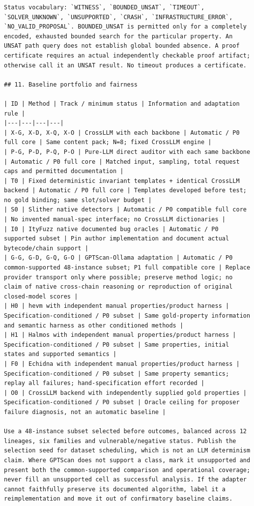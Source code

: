 \documentclass[11pt,a4paper]{article}
\begin{document}
\begin{verbatim}
Status vocabulary: `WITNESS`, `BOUNDED_UNSAT`, `TIMEOUT`, `SOLVER_UNKNOWN`, `UNSUPPORTED`, `CRASH`, `INFRASTRUCTURE_ERROR`, `NO_VALID_PROPOSAL`. BOUNDED_UNSAT is permitted only for a completely encoded, exhausted bounded search for the particular property. An UNSAT path query does not establish global bounded absence. A proof certificate requires an actual independently checkable proof artifact; otherwise call it an UNSAT result. No timeout produces a certificate.

## 11. Baseline portfolio and fairness

| ID | Method | Track / minimum status | Information and adaptation rule |
|---|---|---|---|
| X-G, X-D, X-Q, X-O | CrossLLM with each backbone | Automatic / P0 full core | Same content pack; N=8; fixed CrossLLM engine |
| P-G, P-D, P-Q, P-O | Pure-LLM direct auditor with each same backbone | Automatic / P0 full core | Matched input, sampling, total request caps and permitted documentation |
| T0 | Fixed deterministic invariant templates + identical CrossLLM backend | Automatic / P0 full core | Templates developed before test; no gold binding; same slot/solver budget |
| S0 | Slither native detectors | Automatic / P0 compatible full core | No invented manual-spec interface; no CrossLLM dictionaries |
| I0 | ItyFuzz native documented bug oracles | Automatic / P0 supported subset | Pin author implementation and document actual bytecode/chain support |
| G-G, G-D, G-Q, G-O | GPTScan-Ollama adaptation | Automatic / P0 common-supported 48-instance subset; P1 full compatible core | Replace provider transport only where possible; preserve method logic; no claim of native cross-chain reasoning or reproduction of original closed-model scores |
| H0 | hevm with independent manual properties/product harness | Specification-conditioned / P0 subset | Same gold-property information and semantic harness as other conditioned methods |
| H1 | Halmos with independent manual properties/product harness | Specification-conditioned / P0 subset | Same properties, initial states and supported semantics |
| F0 | Echidna with independent manual properties/product harness | Specification-conditioned / P0 subset | Same property semantics; replay all failures; hand-specification effort recorded |
| O0 | CrossLLM backend with independently supplied gold properties | Specification-conditioned / P0 subset | Oracle ceiling for proposer failure diagnosis, not an automatic baseline |

Use a 48-instance subset selected before outcomes, balanced across 12 lineages, six families and vulnerable/negative status. Publish the selection seed for dataset scheduling, which is not an LLM determinism claim. Where GPTScan does not support a class, mark it unsupported and present both the common-supported comparison and operational coverage; never fill an unsupported cell as successful analysis. If the adapter cannot faithfully preserve its documented algorithm, label it a reimplementation and move it out of confirmatory baseline claims.


\end{verbatim}
\end{document}
